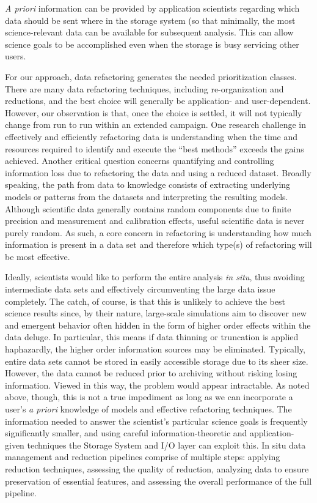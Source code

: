 \textit{A priori} information can be provided by application scientists regarding which data should be sent where in the storage system (so that minimally, the most science-relevant data can be available for subsequent analysis. This can allow science goals to be accomplished even when the storage is busy servicing other users. 

For our approach, data refactoring generates the needed prioritization classes. There are many data refactoring techniques, including re-organization and reductions, and the best choice will generally be application- and user-dependent. However, our observation is that, once the choice is settled, it will not typically change from run to run within an extended campaign.
One research challenge in effectively and efficiently refactoring data is understanding when the time and resources required to identify and execute the “best methods” exceeds the gains achieved. Another critical question concerns quantifying and controlling information loss due to refactoring the data and using a reduced dataset. Broadly speaking, the path from data to knowledge consists of extracting underlying models or patterns from the datasets and interpreting the resulting models. Although scientific data generally contains random components due to finite precision and measurement and calibration effects, useful scientific data is never purely random. As such, a core concern in refactoring is understanding how much information is present in a data set and therefore which type(s) of refactoring will be most effective. 

Ideally, scientists would like to perform the entire analysis \textit{in situ}, thus avoiding intermediate data sets and effectively circumventing the large data issue completely. The catch, of course, is that this is unlikely to achieve the best science results since, by their nature, large-scale simulations aim to discover new and emergent behavior often hidden in the form of higher order effects within the data deluge. In particular, this means if data thinning or truncation is applied haphazardly, the higher order information sources may be eliminated. 
Typically, entire data sets cannot be stored in easily accessible storage due to its sheer size. However, the data cannot be reduced prior to archiving without risking losing information. Viewed in this way, the problem would appear intractable. As noted above, though, this is not a true impediment as long as we can incorporate a user’s \textit{a priori} knowledge of models and effective refactoring techniques.  The information needed to answer the scientist’s particular science goals is frequently significantly smaller, and using careful information-theoretic and application-given techniques the Storage System and I/O layer can exploit this. In situ data management and reduction pipelines comprise of multiple steps: applying reduction techniques, assessing the quality of reduction, analyzing data to ensure preservation of essential features, and assessing the overall performance of the full pipeline.

